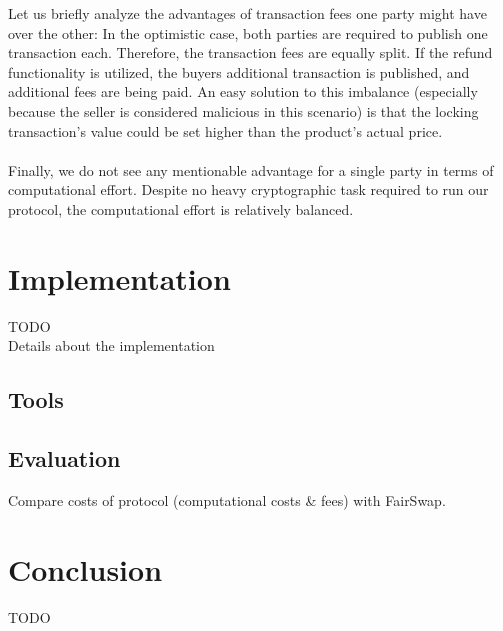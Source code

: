 \documentclass{cacthesis}
\newcounter{protocol}
\begin{document}
        Let us briefly analyze the advantages of transaction fees one party might have over the other: In the optimistic case, both parties are required to publish one transaction each. Therefore, the transaction fees are equally split. If the refund functionality is utilized, the buyers additional transaction is published, and additional fees are being paid. An easy solution to this imbalance (especially because the seller is considered malicious in this scenario) is that the locking transaction's value could be set higher than the product's actual price. \\\\
        Finally, we do not see any mentionable advantage for a single party in terms of computational effort. Despite no heavy cryptographic task required to run our protocol, the computational effort is relatively balanced. 
	    
	\chapter{Implementation}
	    TODO \\
	    Details about the implementation
	    \section{Tools}
	    
	    \section{Evaluation}
	    Compare costs of protocol (computational costs \& fees) with FairSwap.
	    
	\chapter{Conclusion}
    TODO \\
	
	\newpage
    
    
	
	\appendix
\end{document}
